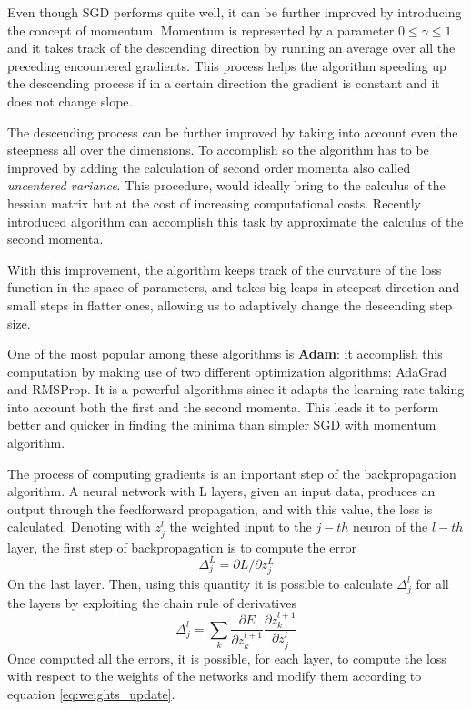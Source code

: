 \documentclass[11pt]{report}
\begin{document}
Even though SGD performs quite well, it can be further improved by introducing the concept of momentum.
Momentum is represented by a parameter $0\le \gamma \le 1$ and it takes track of the descending direction by running an average over all the preceding encountered gradients.
This process helps the algorithm speeding up the descending process if in a certain direction the gradient is constant and it does not change slope.

The descending process can be further improved by taking into account even the steepness all over the dimensions.
To accomplish so the algorithm has to be improved by adding the calculation of second order momenta also called \emph{uncentered variance}.
This procedure, would ideally bring to the calculus of the hessian matrix but at the cost of increasing computational costs.
Recently introduced algorithm can accomplish this task by approximate the calculus of the second momenta.

With this improvement, the algorithm keeps track of the curvature of the loss function in the space of parameters, and takes big leaps in steepest direction and small steps in flatter ones, allowing us to adaptively change the descending step size.

One of the most popular among these algorithms is \textbf{Adam}: it accomplish this computation by making use of two different optimization algorithms: AdaGrad and RMSProp.
It is a powerful algorithms since it adapts the learning rate taking into account both the first and the second momenta.
This leads it to perform better and quicker in finding the minima than simpler SGD with momentum algorithm.
\hfill

\noindent The process of computing gradients is an important step of the backpropagation algorithm.
A neural network with L layers, given an input data, produces an output through the feedforward propagation, and with this value, the loss is calculated.
Denoting with $z_j^l$ the weighted input to the $j-th$ neuron of the $l-th$ layer, the first step of backpropagation is to compute the error
\[
\Delta_j^L =\partial L/\partial z_j^L
\]
On the last layer. Then, using this quantity it is possible to calculate $\Delta_j^l$ for all the layers by exploiting the chain rule of derivatives
\[
\Delta_j^l = \sum_k \frac{\partial E}{\partial z_k^{l+1}}\frac{\partial z_k^{l+1}}{\partial z_j^l}
\]
Once computed all the errors, it is possible, for each layer, to compute the loss with respect to the weights of the networks and modify them according to equation \ref{eq:weights_update}.
\end{document}
